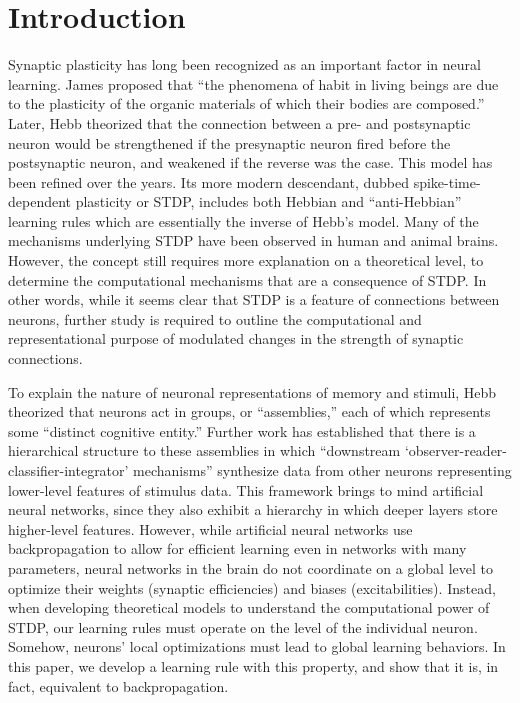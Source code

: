 \documentclass[12pt]{article}
\begin{document}
\section{Introduction}
Synaptic plasticity has long been recognized as an important factor in neural learning. James \cite{James1890} proposed that ``the phenomena of habit in living beings are due to the plasticity of the organic materials of which their bodies are composed.'' Later, Hebb \cite{Hebb1949} theorized that the connection between a pre- and postsynaptic neuron would be strengthened if the presynaptic neuron fired before the postsynaptic neuron, and weakened if the reverse was the case. This model has been refined over the years. \cite{Markram2012} Its more modern descendant, dubbed spike-time-dependent plasticity or STDP, includes both Hebbian and ``anti-Hebbian'' learning rules which are essentially the inverse of Hebb's model. \cite{Carlson1990} Many of the mechanisms underlying STDP have been observed in human and animal brains. \cite{Markram2011} However, the concept still requires more explanation on a theoretical level, to determine the computational mechanisms that are a consequence of STDP. In other words, while it seems clear that STDP is a feature of connections between neurons, further study is required to outline the computational and representational purpose of modulated changes in the strength of synaptic connections.

To explain the nature of neuronal representations of memory and stimuli, Hebb theorized that neurons act in groups, or ``assemblies,'' each of which represents some ``distinct cognitive entity.'' \cite{Hebb1949} Further work has established that there is a hierarchical structure to these assemblies in which ``downstream `observer-reader-classifier-integrator' mechanisms'' synthesize data from other neurons representing lower-level features of stimulus data. \cite{Buzsaki2010} This framework brings to mind artificial neural networks, since they also exhibit a hierarchy in which deeper layers store higher-level features. \cite{HighLevelFeaturesANN} However, while artificial neural networks use backpropagation to allow for efficient learning even in networks with many parameters, \cite{backprop} neural networks in the brain do not coordinate on a global level to optimize their weights (synaptic efficiencies) and biases (excitabilities). \cite{Dahmen2022} Instead, when developing theoretical models to understand the computational power of STDP, our learning rules must operate on the level of the individual neuron. Somehow, neurons' local optimizations must lead to global learning behaviors. In this paper, we develop a learning rule with this property, and show that it is, in fact, equivalent to backpropagation.
\end{document}
